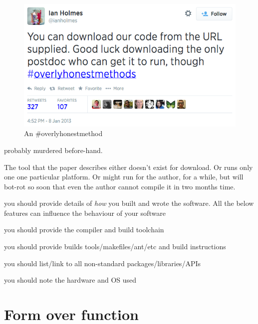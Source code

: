 \documentclass[conference]{IEEEtran}
\begin{document}
\begin{figure}[!ht]
\centering
\includegraphics[width=\columnwidth]{overlyhonesttweet.png}
\caption{An \#overlyhonestmethod}
\label{fig:overlyhonestmethod} 
\end{figure}



probably murdered before-hand. 

The tool that the paper describes either doesn't exist for
download. Or runs only one one particular platform. Or might run for
the author, for a while, but will bot-rot so soon that even the author
cannot compile it in two months time.



you should provide details of \emph{how} you built and wrote the software. All the below features can influence the behaviour of your software

you should provide the compiler and build toolchain

you should provide builds tools/makefiles/ant/etc and build instructions

you should list/link to all non-standard packages/libraries/APIs

you should note the hardware and OS used


\section{Form over function}
\end{document}
